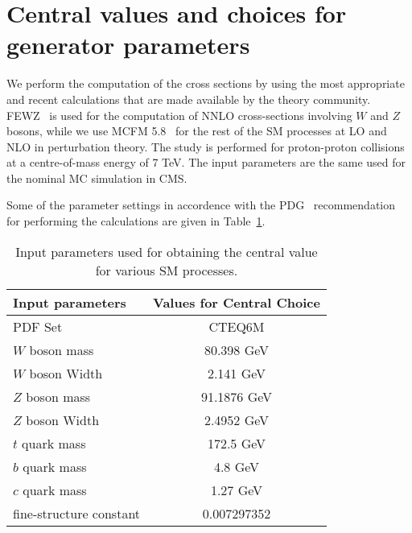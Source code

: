 \section{Central values and choices for generator parameters}
\label{sec:assumptions}
We perform the computation of the cross sections by using the most 
appropriate and recent calculations that are made available by the 
theory community. FEWZ~\cite{fewz} is used for the computation of NNLO 
cross-sections involving $W$ and $Z$ bosons, while we use 
MCFM 5.8~\cite{mcfm} for the rest of the SM processes at LO and NLO in 
perturbation theory. The study is performed for proton-proton collisions at 
a centre-of-mass energy of 7 TeV. The input parameters are the same used for 
the nominal MC simulation in CMS.

Some of the parameter settings in accordence with the PDG~\cite{pdg} 
recommendation for performing the calculations are given in 
Table~\ref{tab:input_params}.

\vspace{0.9mm}
\begin{table}[hbt]
\begin{center}
\renewcommand{\arraystretch}{1.2}
\begin{tabular}{|l|c|}\hline
Input parameters & Values for Central Choice \\ \hline
PDF Set & CTEQ6M \\ \hline
$W$ boson mass & 80.398 GeV \\ \hline	
$W$ boson Width & 2.141 GeV \\ \hline	
$Z$ boson mass & 91.1876 GeV \\ \hline	
$Z$ boson Width & 2.4952 GeV \\ \hline	
$t$ quark mass & 172.5 GeV \\ \hline	
$b$ quark mass & 4.8 GeV \\ \hline	
$c$ quark mass & 1.27 GeV \\ \hline	
fine-structure constant &  0.007297352 \\ \hline	
\end{tabular} 
\caption{Input parameters used for obtaining the central value for various 
SM processes.\label{tab:input_params}}
\end{center}
\end{table}
